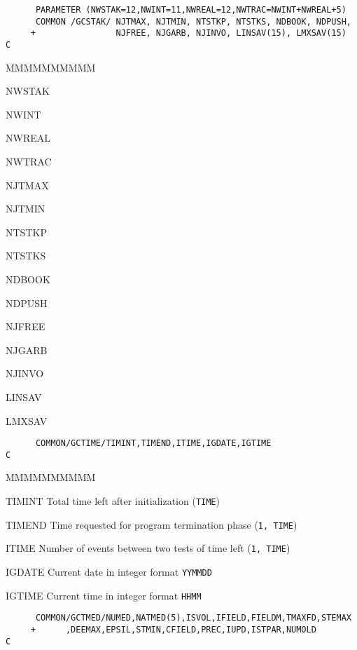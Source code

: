 \begin{verbatim}
      PARAMETER (NWSTAK=12,NWINT=11,NWREAL=12,NWTRAC=NWINT+NWREAL+5)
      COMMON /GCSTAK/ NJTMAX, NJTMIN, NTSTKP, NTSTKS, NDBOOK, NDPUSH,
     +                NJFREE, NJGARB, NJINVO, LINSAV(15), LMXSAV(15)
C
\end{verbatim}
\begin{DLtt}{MMMMMMMMMM}
\item[NWSTAK]
\item[NWINT]
\item[NWREAL]
\item[NWTRAC]
\item[NJTMAX]
\item[NJTMIN]
\item[NTSTKP]
\item[NTSTKS]
\item[NDBOOK]
\item[NDPUSH]
\item[NJFREE]
\item[NJGARB]
\item[NJINVO]
\item[LINSAV]
\item[LMXSAV]
\end{DLtt}
\begin{verbatim}
      COMMON/GCTIME/TIMINT,TIMEND,ITIME,IGDATE,IGTIME
C
\end{verbatim}
\begin{DLtt}{MMMMMMMMMM}
\item[TIMINT] Total time left after initialization  ({\tt TIME})
\item[TIMEND] Time requested
for program termination phase ({\tt 1, TIME})
\item[ITIME] Number of events between two tests of time left
({\tt 1, TIME})
\item[IGDATE]Current date in integer format {\tt YYMMDD}
\item[IGTIME] Current time in integer format {\tt HHMM}
\end{DLtt}
\begin{verbatim}
      COMMON/GCTMED/NUMED,NATMED(5),ISVOL,IFIELD,FIELDM,TMAXFD,STEMAX
     +      ,DEEMAX,EPSIL,STMIN,CFIELD,PREC,IUPD,ISTPAR,NUMOLD
C
\end{verbatim}
